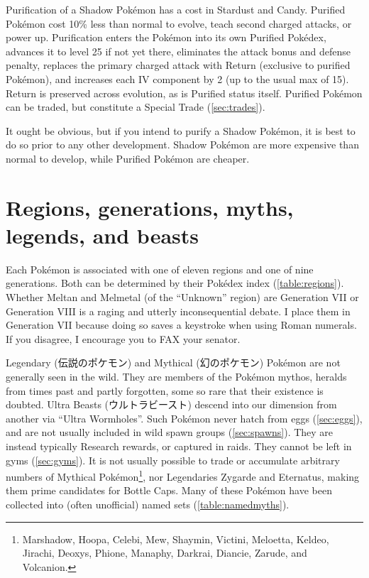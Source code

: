 Purification of a Shadow Pokémon has a cost in Stardust and Candy.
Purified Pokémon cost 10\% less than normal to evolve, teach second charged attacks, or power up.
Purification enters the Pokémon into its own Purified Pokédex,
 advances it to level 25 if not yet there,
 eliminates the attack bonus and defense penalty,
 replaces the primary charged attack with Return (exclusive to purified Pokémon),
 and increases each IV component by 2  (up to the usual max of 15).
Return is preserved across evolution, as is Purified status itself.
Purified Pokémon can be traded, but constitute a Special Trade (\autoref{sec:trades}).

It ought be obvious, but if you intend to purify a Shadow Pokémon, it
  is best to do so prior to any other development.
Shadow Pokémon are more expensive than normal to develop, while Purified Pokémon are cheaper.

\section{Regions, generations, myths, legends, and beasts\label{sec:regions}}
Each Pokémon is associated with one of eleven regions and one of nine generations.
Both can be determined by their Pokédex index (\autoref{table:regions}).
Whether Meltan and Melmetal (of the ``Unknown'' region) are Generation VII
  or Generation VIII is a raging and utterly inconsequential debate.
I place them in Generation VII because doing so saves a keystroke when using Roman numerals.
If you disagree, I encourage you to FAX your senator.

Legendary (\textjapanese{伝説のポケモン}) and Mythical (\textjapanese{幻のポケモン}) Pokémon
 are not generally seen in the wild.
They are members of the Pokémon mythos, heralds from times past and partly forgotten,
  some so rare that their existence is doubted.
Ultra Beasts (\textjapanese{ウルトラビースト}) descend into our dimension from
  another via ``Ultra Wormholes''.
Such Pokémon never hatch from eggs (\autoref{sec:eggs}), and are not usually included in wild spawn groups (\autoref{sec:spawns}).
They are instead typically Research rewards, or captured in raids.
They cannot be left in gyms (\autoref{sec:gyms}).
It is not usually possible to trade or accumulate arbitrary numbers of Mythical
  Pokémon\footnote{Marshadow, Hoopa, Celebi, Mew, Shaymin, Victini, Meloetta, Keldeo,
  Jirachi, Deoxys, Phione, Manaphy, Darkrai, Diancie, Zarude, and Volcanion.}, nor Legendaries Zygarde and
  Eternatus, making them prime candidates for Bottle Caps.
Many of these Pokémon have been collected into (often unofficial) named sets (\autoref{table:namedmyths}).


